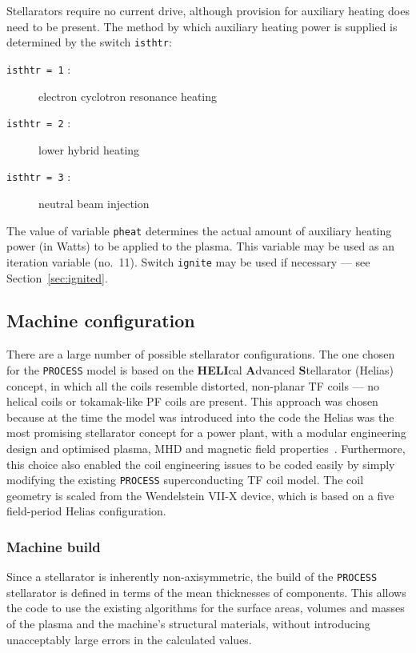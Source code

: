 \documentclass[11pt,a4paper]{report}
\newcommand{\process}{\mbox{\texttt{PROCESS}}}
\begin{document}
Stellarators require no current drive, although provision for auxiliary
heating does need to be present. The method by which auxiliary heating power
is supplied is determined by the switch \texttt{isthtr}:
\begin{description}
\item [\texttt{isthtr = 1} :] electron cyclotron resonance heating
\item [\texttt{isthtr = 2} :] lower hybrid heating
\item [\texttt{isthtr = 3} :] neutral beam injection
\end{description}
The value of variable \texttt{pheat} determines the actual amount of auxiliary
heating power (in Watts) to be applied to the plasma. This variable may be
used as an iteration variable (no.\ 11). Switch \texttt{ignite} may be used if
necessary --- see Section~\ref{sec:ignited}.

\subsection{Machine configuration}

There are a large number of possible stellarator configurations. The one
chosen for the \process\/ model is based on the \textbf{HELI}cal
\textbf{A}dvanced \textbf{S}tellarator (Helias) concept, in which all the
coils resemble distorted, non-planar TF coils --- no helical coils or
tokamak-like PF coils are present.  This approach was chosen because at the
time the model was introduced into the code the Helias was the most promising
stellarator concept for a power plant, with a modular engineering design and
optimised plasma, MHD and magnetic field properties~\cite{HSR}. Furthermore,
this choice also enabled the coil engineering issues to be coded easily by
simply modifying the existing \process\/ superconducting TF coil model. The
coil geometry is scaled from the Wendelstein VII-X device, which is based on a
five field-period Helias configuration.

\subsubsection{Machine build}
\label{sec:stbuild}

Since a stellarator is inherently non-axisymmetric, the build of the \process\/
stellarator is defined in terms of the mean thicknesses of components. This
allows the code to use the existing algorithms for the surface areas, volumes
and masses of the plasma and the machine's structural materials, without
introducing unacceptably large errors in the calculated values.
\end{document}

